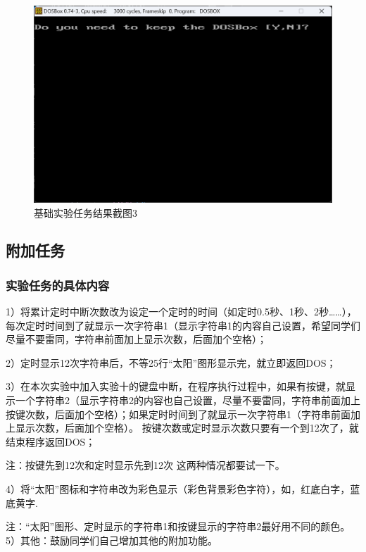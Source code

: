 \documentclass[12pt, a4paper, oneside]{ctexart}
\begin{document}
\begin{figure}[H]
    \centering
    \includegraphics[scale=0.22]{pic/exp11-1-3.png}
    \caption{基础实验任务结果截图3}
    \label{基础实验结果截图3}
\end{figure}
\subsection{附加任务}
\subsubsection{实验任务的具体内容}
1）将累计定时中断次数改为设定一个定时的时间（如定时0.5秒、1秒、2秒……），每次定时时间到了就显示一次字符串1（显示字符串1的内容自己设置，希望同学们尽量不要雷同，字符串前面加上显示次数，后面加个空格）；

2）定时显示12次字符串后，不等25行“太阳”图形显示完，就立即返回DOS；

3）在本次实验中加入实验十的键盘中断，在程序执行过程中，如果有按键，就显示一个字符串2（显示字符串2的内容也自己设置，尽量不要雷同，字符串前面加上按键次数，后面加个空格）；如果定时时间到了就显示一次字符串1（字符串前面加上显示次数，后面加个空格）。 按键次数或定时显示次数只要有一个到12次了，就结束程序返回DOS；

注：按键先到12次和定时显示先到12次 这两种情况都要试一下。

4）将“太阳”图标和字符串改为彩色显示（彩色背景彩色字符），如，红底白字，蓝底黄字.

注：“太阳”图形、定时显示的字符串1和按键显示的字符串2最好用不同的颜色。
5）其他：鼓励同学们自己增加其他的附加功能。
\end{document}
